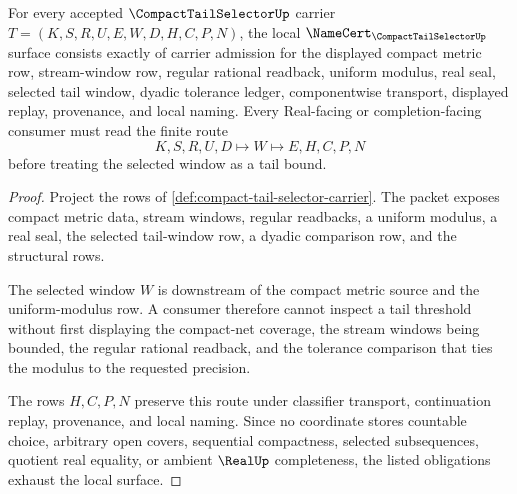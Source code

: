 \begin{theorem}
\label{thm:compact-tail-selector-namecert-obligations}
For every accepted $\CompactTailSelectorUp$ carrier $T=(K,S,R,U,E,W,D,H,C,P,N)$, the local $\NameCert_{\CompactTailSelectorUp}$ surface consists exactly of carrier admission for the displayed compact metric row, stream-window row, regular rational readback, uniform modulus, real seal, selected tail window, dyadic tolerance ledger, componentwise transport, displayed replay, provenance, and local naming. Every Real-facing or completion-facing consumer must read the finite route
$$
K,S,R,U,D\longmapsto W\longmapsto E,H,C,P,N
$$
before treating the selected window as a tail bound.
\end{theorem}
\begin{proof}
Project the rows of \autoref{def:compact-tail-selector-carrier}. The packet exposes compact metric data, stream windows, regular readbacks, a uniform modulus, a real seal, the selected tail-window row, a dyadic comparison row, and the structural rows.

The selected window $W$ is downstream of the compact metric source and the uniform-modulus row. A consumer therefore cannot inspect a tail threshold without first displaying the compact-net coverage, the stream windows being bounded, the regular rational readback, and the tolerance comparison that ties the modulus to the requested precision.

The rows $H,C,P,N$ preserve this route under classifier transport, continuation replay, provenance, and local naming. Since no coordinate stores countable choice, arbitrary open covers, sequential compactness, selected subsequences, quotient real equality, or ambient $\RealUp$ completeness, the listed obligations exhaust the local surface.
\end{proof}

